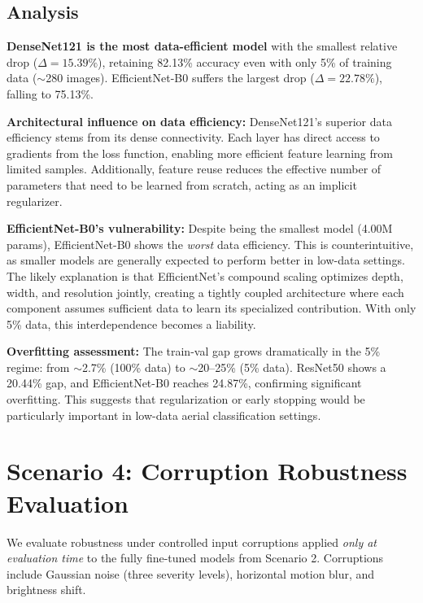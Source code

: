 \documentclass[11pt, a4paper]{article}
\begin{document}
\subsection{Analysis}

\textbf{DenseNet121 is the most data-efficient model} with the smallest relative drop ($\Delta = 15.39\%$), retaining 82.13\% accuracy even with only 5\% of training data ($\sim$280 images). EfficientNet-B0 suffers the largest drop ($\Delta = 22.78\%$), falling to 75.13\%.

\textbf{Architectural influence on data efficiency:} DenseNet121's superior data efficiency stems from its dense connectivity. Each layer has direct access to gradients from the loss function, enabling more efficient feature learning from limited samples. Additionally, feature reuse reduces the effective number of parameters that need to be learned from scratch, acting as an implicit regularizer.

\textbf{EfficientNet-B0's vulnerability:} Despite being the smallest model (4.00M params), EfficientNet-B0 shows the \emph{worst} data efficiency. This is counterintuitive, as smaller models are generally expected to perform better in low-data settings. The likely explanation is that EfficientNet's compound scaling optimizes depth, width, and resolution jointly, creating a tightly coupled architecture where each component assumes sufficient data to learn its specialized contribution. With only 5\% data, this interdependence becomes a liability.

\textbf{Overfitting assessment:} The train-val gap grows dramatically in the 5\% regime: from $\sim$2.7\% (100\% data) to $\sim$20–25\% (5\% data). ResNet50 shows a 20.44\% gap, and EfficientNet-B0 reaches 24.87\%, confirming significant overfitting. This suggests that regularization or early stopping would be particularly important in low-data aerial classification settings.


\section{Scenario 4: Corruption Robustness Evaluation}

We evaluate robustness under controlled input corruptions applied \emph{only at evaluation time} to the fully fine-tuned models from Scenario 2. Corruptions include Gaussian noise (three severity levels), horizontal motion blur, and brightness shift.
\end{document}

